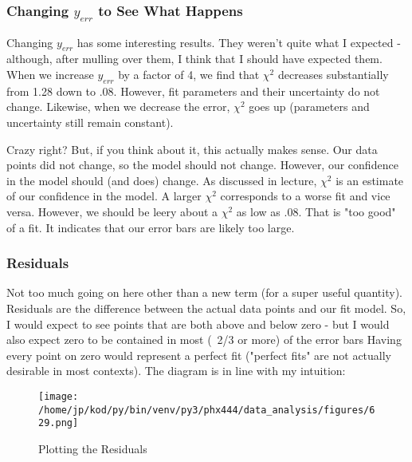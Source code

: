 \documentclass{article}
\begin{document}
\subsubsection{Changing $y_{err}$ to See What Happens}

Changing $y_{err}$ has some interesting results. They weren't quite what I
expected - although, after mulling over them, I think that I should have expected
them. When we increase $y_{err}$ by a factor of 4, we find that $\chi^2$
decreases substantially from 1.28 down to .08. However,  fit parameters and
their uncertainty do not change. Likewise, when we decrease the error, $\chi^2$
goes up (parameters and uncertainty still remain constant).

Crazy right? But, if you think about it, this actually makes sense. Our data
points did not change, so the model should not change. However, our
confidence in the model should (and does) change. As discussed in lecture, $\chi^2$ 
is an estimate of our confidence in the model. A larger $\chi^2$ corresponds to
a worse fit and vice versa. However, we should be leery about a $\chi^2$ as low
as .08. That is "too good" of a fit. It indicates that our error bars are
likely too large.

\subsubsection{Residuals}
Not too much going on here other than a new term (for a super useful quantity).
Residuals are the difference between the actual data points and our fit model.
So, I would expect to see points that are both above and below zero - but I would
also expect zero to be contained in most (~2/3 or more) of the error bars Having
every point on zero would represent a perfect fit ("perfect fits" are not
actually desirable in most contexts). The diagram is in line with my intuition:


\begin{figure}[H]
        \begin{center}
        \texttt{[image: /home/jp/kod/py/bin/venv/py3/phx444/data\_analysis/figures/629.png]}
        \caption{Plotting the Residuals}
        \label{fig:fig_20}
        \end{center}
\end{figure}
\end{document}
